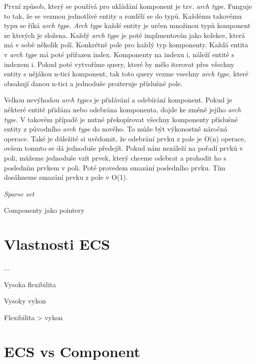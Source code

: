 První způsob, který se používá pro ukládání komponent je tzv. \textit{arch type}. Funguje to tak, že se vezmou jednotlivé entity a rozdělí se do typů. Každému takovému typu se říká \textit{arch type}. \textit{Arch type} každé entity je určen množinou typů komponent ze kterých je složena. Každý \textit{arch type} je poté implmentován jako kolekce, která má v sobě několik polí. Konkrétně pole pro každý typ komponenty. Každá entita v \textit{arch type} má poté přiřazen index. Komponenty na indexu i, náleží entitě s indexem i. Pokud poté vytvoříme query, které by mělo iterovat přes všechny entity s nějákou n-ticí komponent, tak toto query vezme vsechny \textit{arch type}, které obsahují danou n-tici a jednoduše proiteruje příslušné pole.


Velkou nevýhodou \textit{arch types} je přidávání a odebírání komponent. Pokud je některé entitě přidána nebo odebrána komponenta, dojde ke změně jejího \textit{arch type}. V takovém případě je nutné překopírovat všechny komponenty příslušné entity z původního \textit{arch type} do nového. To může být výkonostně náročná operace. Také je důležité si uvědomit, že odebrání prvku z pole je O(n) operace, ovšem tomuto se dá jednoduše předejít. Pokud nám nezáleží na pořadí prvků v poli, můžeme jednoduše vzít prvek, který chceme odebrat a prohodit ho s posledním prvkem v poli. Poté provedem smazání posledního prvku. Tím dosáhneme smazání prvku z pole v O(1).

\textit{Sparse set}

Componenty jako pointery

\section{Vlastnosti ECS}
...

Vysoka flexibilita

Vysoky vykon

Flexibilita > vykon

\section{ECS vs Component}


